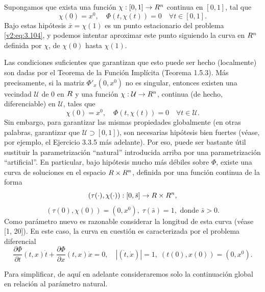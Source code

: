 Supongamos que exista una función $\chi : [0, 1] \to R^n$ continua en $[0, 1]$, tal que
\begin{equation}
    \chi(0) = x^0, \quad \Phi(t, \chi(t)) = 0 \quad \forall t \in [0, 1].
    \label{v2:eq:3.106}
\end{equation}
Bajo estas hipótesis $\bar{x} = \chi(1)$ es un punto estacionario del problema \eqref{v2:eq:3.104}, y podemos intentar aproximar este punto siguiendo la curva en $R^n$ definida por $\chi$, de $\chi(0)$ hasta $\chi(1)$.

Las condiciones suficientes que garantizan que esto puede ser hecho (localmente) son dadas por el Teorema de la Función Implícita (Teorema 1.5.3). Más precisamente, si la matriz $\Phi'_x(0, x^0)$ no es singular, entonces existen una vecindad $\mathcal{U}$ de $0$ en $R$ y una función $\chi : \mathcal{U} \to R^n$, continua (de hecho, diferenciable) en $\mathcal{U}$, tales que
\[
    \chi(0) = x^0, \quad \Phi(t, \chi(t)) = 0 \quad \forall t \in \mathcal{U}.
\]
Sin embargo, para garantizar las mismas propiedades globalmente (en otras palabras, garantizar que $\mathcal{U} \supset [0, 1]$), son necesarias hipótesis bien fuertes (véase, por ejemplo, el Ejercicio 3.3.5 más adelante). Por eso, puede ser bastante útil sustituir la parametrización ``natural'' introducida arriba por una parametrización ``artificial''. En particular, bajo hipótesis mucho más débiles sobre $\Phi$, existe una curva de soluciones en el espacio $R \times R^n$, definida por una función continua de la forma
\[
    (\tau(\cdot), \chi(\cdot)) : [0, \bar{s}] \to R \times R^n,
\]
\[
    (\tau(0), \chi(0)) = (0, x^0), \; \tau(\bar{s}) = 1, \text{ donde } \bar{s} > 0.
\]
Como parámetro nuevo es razonable considerar la longitud de esta curva (véase [1, 20]). En este caso, la curva en cuestión es caracterizada por el problema diferencial
\[
    \frac{\partial \Phi}{\partial t}(t, x)\dot{t} + \frac{\partial \Phi}{\partial x}(t, x)\dot{x} = 0, \quad |(\dot{t}, \dot{x})| = 1, \; (t(0), x(0)) = (0, x^0).
\]

Para simplificar, de aquí en adelante consideraremos solo la continuación global en relación al parámetro natural.

